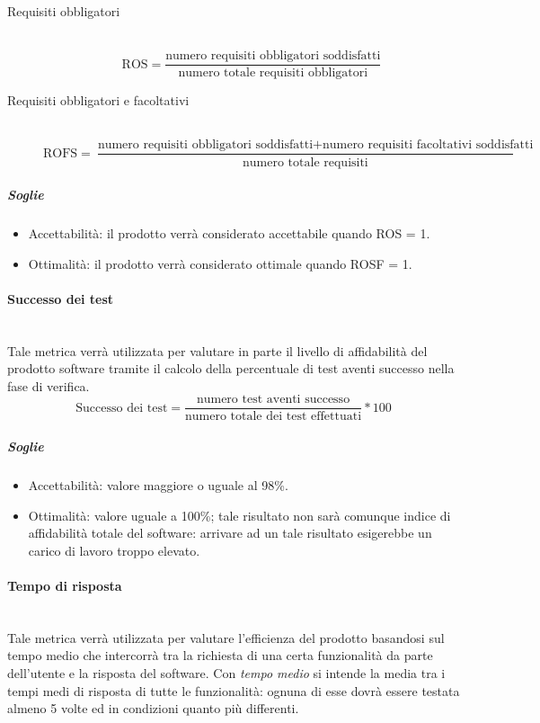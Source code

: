 \begin{description}
\item[Requisiti obbligatori]
	~\\ \begin{displaymath}
		\mbox{ROS}=\frac{\mbox{numero requisiti obbligatori soddisfatti}}{\mbox{numero totale requisiti obbligatori}}
	\end{displaymath}
	
\item[Requisiti obbligatori e facoltativi]
	~\\ \begin{displaymath}
		\mbox{ROFS}=\frac{\mbox{numero requisiti obbligatori soddisfatti} + \mbox{numero requisiti facoltativi soddisfatti}}{\mbox{numero totale requisiti}}
	\end{displaymath}
\end{description}

\subparagraph{Soglie}
\begin{itemize}
\item Accettabilità: il prodotto verrà considerato accettabile quando ROS = 1.
\item Ottimalità: il prodotto verrà considerato ottimale quando ROSF = 1.
\end{itemize}

\paragraph{Successo dei test}
\label{AppB:Affidabilita}
	~\\Tale metrica verrà utilizzata per valutare in parte il livello di affidabilità del prodotto software tramite il calcolo della percentuale di test aventi successo nella fase di verifica.
	\begin{displaymath}
		\mbox{Successo dei test}=\frac{\mbox{numero test aventi successo}}{\mbox{numero totale dei test effettuati}} * 100
	\end{displaymath}
	
	\subparagraph{Soglie}
	\begin{itemize}
	\item Accettabilità: valore maggiore o uguale al 98\%.
	\item Ottimalità: valore uguale a 100\%; tale risultato non sarà comunque indice di affidabilità totale del software: arrivare ad un tale risultato esigerebbe un carico di lavoro troppo elevato.
	\end{itemize}
	
\paragraph{Tempo di risposta}
\label{AppB:Efficienza}
	~\\Tale metrica verrà utilizzata per valutare l'efficienza del prodotto basandosi sul tempo medio che intercorrà tra la richiesta di una certa funzionalità da parte dell'utente e la risposta del software. Con \textit{tempo medio} si intende la media tra i tempi medi di risposta di tutte le funzionalità: ognuna di esse dovrà essere testata almeno 5 volte ed in condizioni quanto più differenti.
	
